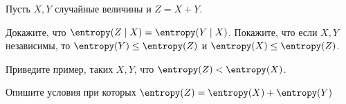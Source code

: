 Пусть $X, Y$ случайные величины и $Z = X + Y$.
\begin{enumcyr}
    \item Докажите, что $\entropy(Z \mid X) = \entropy(Y \mid X)$. Покажите, что если $X, Y$
        независимы, то $\entropy(Y) \leq \entropy(Z)$ и $\entropy(X) \leq \entropy(Z)$.
    \item Приведите пример, таких $X, Y$, что $\entropy(Z) < \entropy(X)$.
    \item Опишите условия при которых $\entropy(Z) = \entropy(X) + \entropy(Y)$
\end{enumcyr}